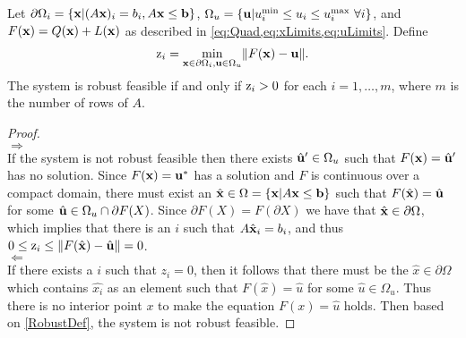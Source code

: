   \medskip
\begin{thm} \label{thm:RobFeas}
  Let $\partial\Omega_i=\{\mathbf{x}| (A\mathbf{x})_i = b_i, A\mathbf{x}\leq \mathbf{b}\}$, $\Omega_{u}=\{\mathbf{u}| u^{\min}_i\leq u_i \leq u^{\max}_i \ \forall i \}$, and $F(\mathbf{x})=Q(\mathbf{x})+L(\mathbf{x})$ as described in \cref{eq:Quad,eq:xLimits,eq:uLimits}.
  Define
  \begin{align}
    \mathrm{z}_i =  \min_{\mathbf{x}\in\partial\Omega_i, \mathbf{u} \in \Omega_u} \lVert F(\mathbf{x})-\mathbf{u}\rVert. \label{eq:OPTfeas}
  \end{align}
  The system is robust feasible if and only if $\mathrm{z}_i>0$ for each $i = 1, \ldots, m$, where $m$ is the number of rows of $A$.

  \begin{proof} \ \\
    $\boxed{\Rightarrow}$ \\ 
    If the system is not robust feasible then there exists $\hat{\mathbf{u}}'\in \Omega_u$ such that $F(\mathbf{x})=\hat{\mathbf{u}}'$ has no solution. 
    Since $F(\mathbf{x})=\mathbf{u}^*$ has a solution and $F$ is continuous over a compact domain, there must exist an $\hat{\mathbf{x}} \in \Omega = \{\mathbf{x}| A\mathbf{x} \leq \mathbf{b}\}$ such that $F(\hat{\mathbf{x}})=\hat{\mathbf{u}}$ for some $\hat{\mathbf{u}}\in \Omega_u\cap \partial F(X)$. 
    Since $\partial F(X) = F(\partial X)$ we have that $\hat{\mathbf{x}}\in\partial\Omega$, which implies that there is an $i$ such that $A\hat{\mathbf{x}}_i=b_i$, and thus $0 \leq \mathrm{z}_i \leq \lVert F(\hat{\mathbf{x}})-\hat{\mathbf{u}}\rVert=0$.\\
    $\boxed{\Leftarrow}$ \\ 
    If there exists a $i$ such that $z_i=0$, then it follows that there must be the $\hat{x}\in \partial \Omega$ which contains $\hat{x_i}$ as an element such that $F(\hat{x})=\hat{u}$ for some $\hat{u}\in \Omega_u$. Thus there is no interior point $x$ to make the equation $F(x)=\hat{u}$ holds. Then based on \cref{RobustDef}, the system is not robust feasible. 
  \end{proof}
\end{thm}

